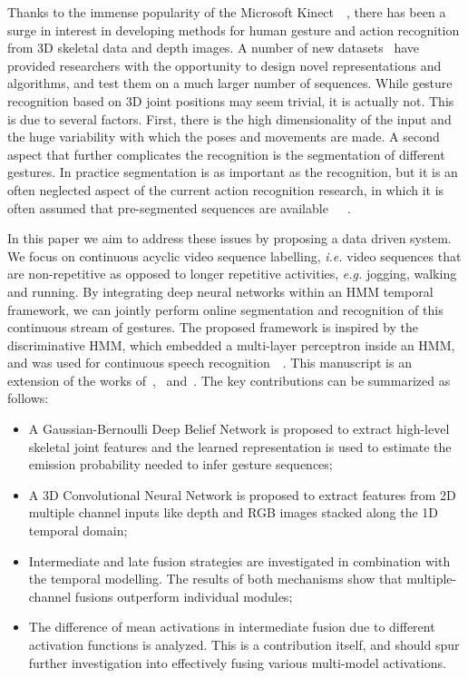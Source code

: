 Thanks to the immense popularity of the Microsoft Kinect~\cite{shotton2011real}~\cite{lingshao2}, there has been a surge in interest in developing methods for human gesture and action recognition from 3D skeletal data and depth images.
A number of new datasets~\cite{ICMI,fothergill2012instructing,guyon2012chalearn,wang2012mining} have provided researchers with the opportunity to design novel representations and algorithms, and test them on a much larger number of sequences.
While gesture recognition based on 3D joint positions may seem trivial, it is actually not. This is due to several factors. First, there is the high dimensionality of the input and the huge variability with which the poses and movements are made.
A second aspect that further complicates the recognition is the segmentation of different gestures. In practice segmentation is as important as the recognition, but it is an often neglected aspect of the current action recognition research, in which it is often assumed that  pre-segmented sequences are available~\cite{laptev2005space}~\cite{marszalek09}~\cite{Kuehne11}.

In this paper we aim to address these issues by proposing a data driven system. We focus on continuous acyclic video sequence labelling, \emph{i.e.} video sequences that are non-repetitive as opposed to longer repetitive activities, \textit{e.g.} jogging, walking and running. By integrating deep neural networks within an HMM temporal framework, we can jointly perform online segmentation and recognition of this continuous stream of gestures. The proposed framework is inspired by the discriminative HMM, which embedded a multi-layer perceptron inside an HMM, and was used for continuous speech recognition~\cite{renals1994connectionist}~\cite{bourlard1994connectionist}.
This manuscript is an extension of the works of~\cite{diwucvpr14},~\cite{wu2014deep} and~\cite{lio2014deep}.
The key contributions can be summarized as follows:
\begin{itemize}
\item A Gaussian-Bernoulli Deep Belief Network is proposed to extract high-level skeletal joint features and the learned representation is used to estimate the emission probability needed to infer gesture sequences;
\item A 3D Convolutional Neural Network  is proposed to extract features from 2D multiple channel inputs like depth and RGB images stacked along the 1D temporal domain;
\item Intermediate and late fusion strategies are investigated in combination with the temporal modelling. The results of both mechanisms show that multiple-channel fusions outperform individual modules;
\item The difference of mean activations in intermediate fusion due to different activation functions is analyzed. This is a contribution itself, and should spur further investigation into effectively fusing various multi-model activations.
\end{itemize}

